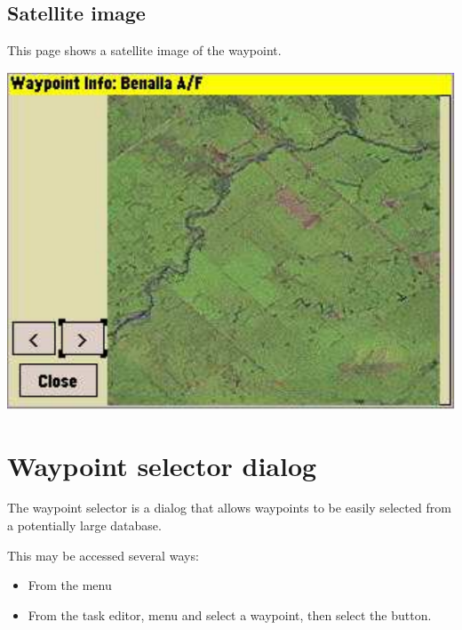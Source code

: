 \documentclass[a4paper,12pt]{refrep}
\begin{document}
\subsection*{Satellite image}
This page shows a satellite image of the
waypoint.

\begin{center}
\includegraphics[angle=0,width=\linewidth,keepaspectratio='true']{figures/dialog-waypointdetails2.pdf}
\end{center}


\section{Waypoint selector dialog}
The waypoint selector is a dialog that allows waypoints to be easily selected
from a potentially large database.

This may be accessed several ways:
\begin{itemize}
\item From the menu \blink{}
\item From the task editor, menu \blink{} and select
 a waypoint, then select the  button.
\end{itemize}
\end{document}
